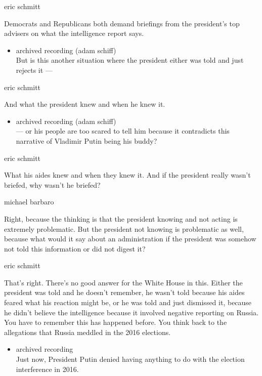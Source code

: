 eric schmitt

Democrats and Republicans both demand briefings from the president's top
advisers on what the intelligence report says.

\begin{itemize}
\tightlist
\item
  archived recording (adam schiff)\\
  But is this another situation where the president either was told and
  just rejects it ---
\end{itemize}

eric schmitt

And what the president knew and when he knew it.

\begin{itemize}
\tightlist
\item
  archived recording (adam schiff)\\
  --- or his people are too scared to tell him because it contradicts
  this narrative of Vladimir Putin being his buddy?
\end{itemize}

eric schmitt

What his aides knew and when they knew it. And if the president really
wasn't briefed, why wasn't he briefed?

michael barbaro

Right, because the thinking is that the president knowing and not acting
is extremely problematic. But the president not knowing is problematic
as well, because what would it say about an administration if the
president was somehow not told this information or did not digest it?

eric schmitt

That's right. There's no good answer for the White House in this. Either
the president was told and he doesn't remember, he wasn't told because
his aides feared what his reaction might be, or he was told and just
dismissed it, because he didn't believe the intelligence because it
involved negative reporting on Russia. You have to remember this has
happened before. You think back to the allegations that Russia meddled
in the 2016 elections.

\begin{itemize}
\tightlist
\item
  archived recording\\
  Just now, President Putin denied having anything to do with the
  election interference in 2016.
\end{itemize}

